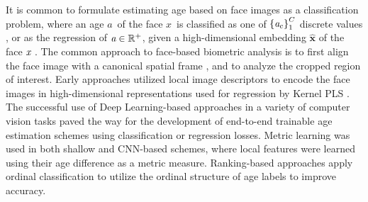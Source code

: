 \documentclass[10pt,journal]{IEEEtran}\usepackage{amsfonts}
\begin{document}
It is common to formulate estimating age based on face images as a
classification problem, where an age $a$\ of the face $x$\ is
classified as one of $\left\{  \emph{a}_{c}\right\}  _{1}^{C}$
discrete values
\cite{eidinger2014age,guo2011simultaneous,chang2011ordinal,ZhengSun2012,ramon2012gender,guo2010human}, or as the regression of $\emph{a}\in\mathbb{R}^{+}$, given a
high-dimensional embedding $\widehat{\mathbf{x}}$ of the face $\emph{x}$
\cite{guo2011simultaneous,guo2010human,eidinger2014age,wang2015age,ChenGong2013,leviage}. The common approach to face-based biometric analysis is to first align the
face image with a canonical spatial frame \cite{RetinaFace}, and to analyze
the cropped region of interest. Early approaches utilized local image
descriptors \cite{ramon2012gender} to encode the face images in
high-dimensional representations used for regression by Kernel PLS
\cite{guo2011simultaneous}. The successful use of Deep Learning-based
approaches in a variety of computer vision tasks paved the way for the
development of end-to-end trainable age estimation schemes
\cite{8017500,deepage} using classification or regression losses. Metric
learning was used in both shallow \cite{1640964} and CNN-based
\cite{8017500,8578147,TianCCY19} schemes, where local features were learned
using their age difference as a metric measure. Ranking-based approaches
\cite{8099569,7780901, 9145576, Dark_Knowledge} apply ordinal classification
to utilize the ordinal structure of age labels to improve accuracy.
\end{document}
